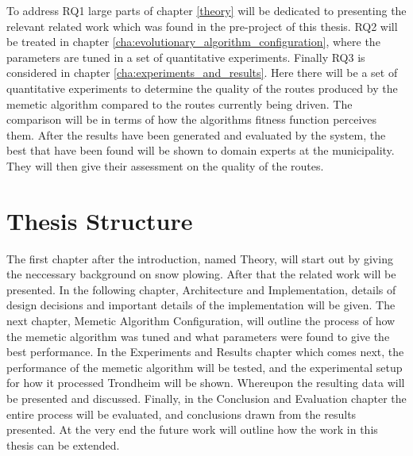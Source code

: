 To address RQ1 large parts of chapter \ref{theory} will be dedicated to presenting the relevant related work which was found in the pre-project of this thesis. RQ2 will be treated in chapter \ref{cha:evolutionary_algorithm_configuration}, where the parameters are tuned in a set of quantitative experiments. Finally RQ3 is considered in chapter \ref{cha:experiments_and_results}. Here there will be a set of quantitative experiments to determine the quality of the routes produced by the memetic algorithm compared to the routes currently being driven. The comparison will be in terms of how the algorithms fitness function perceives them. After the results have been generated and evaluated by the system, the best that have been found will be shown to domain experts at the municipality. They will then give their assessment on the quality of the routes.

\section{Thesis Structure}

The first chapter after the introduction, named Theory, will start out by giving the neccessary background on snow plowing. After that the related work will be presented. In the following chapter, Architecture and Implementation, details of design decisions and important details of the implementation will be given. The next chapter, Memetic Algorithm Configuration, will outline the process of how the memetic algorithm was tuned and what parameters were found to give the best performance. In the Experiments and Results chapter which comes next, the performance of the memetic algorithm will be tested, and the experimental setup for how it processed Trondheim will be shown. Whereupon the resulting data will be presented and discussed. Finally, in the Conclusion and Evaluation chapter the entire process will be evaluated, and conclusions drawn from the results presented. At the very end the future work will outline how the work in this thesis can be extended.

\cleardoublepage
